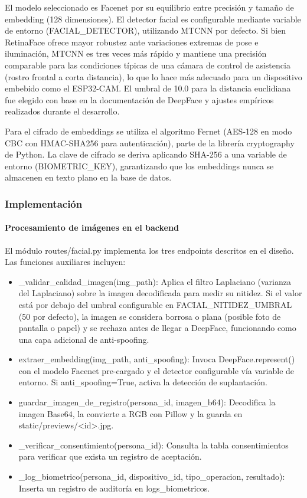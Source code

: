 El modelo seleccionado es Facenet por su equilibrio entre precisión y tamaño de embedding (128 dimensiones). El detector facial es configurable mediante variable de entorno (FACIAL\_DETECTOR), utilizando MTCNN por defecto. Si bien RetinaFace ofrece mayor robustez ante variaciones extremas de pose e iluminación, MTCNN es tres veces más rápido y mantiene una precisión comparable para las condiciones típicas de una cámara de control de asistencia (rostro frontal a corta distancia), lo que lo hace más adecuado para un dispositivo embebido como el ESP32-CAM. El umbral de 10.0 para la distancia euclidiana fue elegido con base en la documentación de DeepFace y ajustes empíricos realizados durante el desarrollo.

Para el cifrado de embeddings se utiliza el algoritmo Fernet (AES-128 en modo CBC con HMAC-SHA256 para autenticación), parte de la librería cryptography de Python. La clave de cifrado se deriva aplicando SHA-256 a una variable de entorno (BIOMETRIC\_KEY), garantizando que los embeddings nunca se almacenen en texto plano en la base de datos.

\subsubsection{Implementación}

\paragraph{Procesamiento de imágenes en el backend}

El módulo routes/facial.py implementa los tres endpoints descritos en el diseño. Las funciones auxiliares incluyen:

\begin{itemize}
    \item \_validar\_calidad\_imagen(img\_path): Aplica el filtro Laplaciano (varianza del Laplaciano) sobre la imagen decodificada para medir su nitidez. Si el valor está por debajo del umbral configurable en FACIAL\_NITIDEZ\_UMBRAL (50 por defecto), la imagen se considera borrosa o plana (posible foto de pantalla o papel) y se rechaza antes de llegar a DeepFace, funcionando como una capa adicional de anti-spoofing.
    \item extraer\_embedding(img\_path, anti\_spoofing): Invoca DeepFace.represent() con el modelo Facenet pre-cargado y el detector configurable vía variable de entorno. Si anti\_spoofing=True, activa la detección de suplantación.
    \item guardar\_imagen\_de\_registro(persona\_id, imagen\_b64): Decodifica la imagen Base64, la convierte a RGB con Pillow y la guarda en static/previews/<id>.jpg.
    \item \_verificar\_consentimiento(persona\_id): Consulta la tabla consentimientos para verificar que exista un registro de aceptación.
    \item \_log\_biometrico(persona\_id, dispositivo\_id, tipo\_operacion, resultado): Inserta un registro de auditoría en logs\_biometricos.
\end{itemize}

